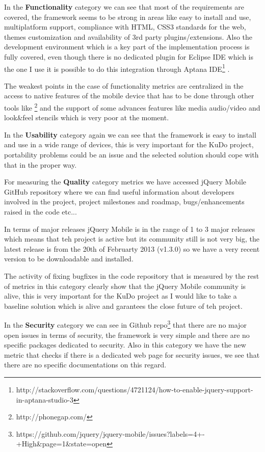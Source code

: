 \documentclass[a4paper,12pt]{book}
\begin{document}
In the \textbf{Functionality} category we can see that most of the requirements are covered, the framework seems to be strong in areas like easy to install and use, multiplatform support, compliance with HTML, CSS3 standards for the web, themes customization and availability of 3rd party plugins/extensions. Also the development environment which is a key part of the implementation process is fully covered, even though there is no dedicated plugin for Eclipse IDE which is the one I use it is possible to do this integration through Aptana IDE\footnote{http://stackoverflow.com/questions/4721124/how-to-enable-jquery-support-in-aptana-studio-3} .

The weakest points in the case of functionality metrics are centralized in the access to native features of the mobile device that has to be done through other tools like \footnote{http://phonegap.com/}  and the support of some advances features like media audio/video and look\&feel stencils which is very poor at the moment.

In the \textbf{Usability} category again we can see that the framework is easy to install and use in a wide range of devices, this is very important for the KuDo project, portability problems could be an issue and the selected solution should cope with that in the proper way.

For measuring the \textbf{Quality} category metrics we have accessed jQuery Mobile GitHub repository\cite{jQuery Mobile Github repo} where we can find useful information about developers involved in the project, project milestones and roadmap, bugs/enhancements raised in the code etc...

In terms of major releases jQuery Mobile is in the range of 1 to 3 major releases which means that teh project is active but its community still is not very big, the latest release is from the 20th of Februarty 2013 (v1.3.0) so we have a very recent version to be downloadable and installed.

The activity of fixing bugfixes in the code repository that is measured by the rest of metrics in this category clearly show that the jQuery Mobile community is alive, this is very important for the KuDo project as I would like to take a baseline solution which is alive and garantees the close future of teh project.

In the \textbf{Security} category we can see in Github repo\footnote{https://github.com/jquery/jquery-mobile/issues?labels=4+-+High\&page=1\&state=open}  that there are no major open issues in terms of security, the framework is very simple and there are no specific packages dedicated to security. Also in this category we have the new metric that checks if there is a dedicated web page for security issues, we see that there are no specific documentations on this regard.
\end{document}
